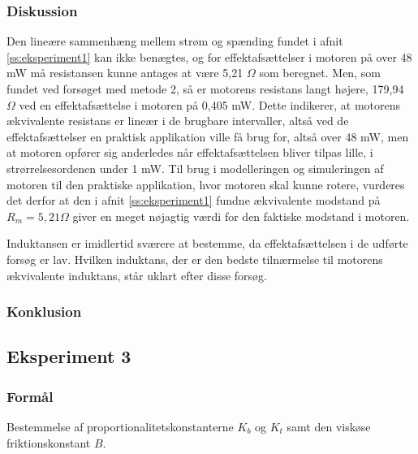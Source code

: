 \subsubsection{Diskussion}
Den lineære sammenhæng mellem strøm og spænding fundet i afnit \ref{ss:eksperiment1} kan ikke benægtes,
og for effektafsættelser i motoren på over 48 mW må resistansen kunne antages at være 5,21 $\Omega$ som beregnet.
Men, som fundet ved forsøget med metode 2, så er motorens resistans langt højere,
179,94 $\Omega$ ved en effektafsættelse i motoren på 0,405 mW.
Dette indikerer, at motorens ækvivalente resistans er lineær i de brugbare intervaller, altså ved de effektafsættelser en
praktisk applikation ville få brug for, altså over 48 mW, men at motoren opfører sig anderledes når effektafsættelsen
bliver tilpas lille, i strørrelsesordenen under 1 mW.
Til brug i modelleringen og simuleringen af motoren til den praktiske applikation, hvor motoren skal kunne rotere,
vurderes det derfor at den i afnit \ref{ss:eksperiment1} fundne ækvivalente modstand på $R_m=5,21 \Omega$ giver en meget
nøjagtig værdi for den faktiske modstand i motoren.

Induktansen er imidlertid sværere at bestemme, da effektafsættelsen i de udførte forsøg er lav.
Hvilken induktans, der er den bedste tilnærmelse til motorens ækvivalente induktans,
står uklart efter disse forsøg.

\subsubsection{Konklusion}


\subsection{Eksperiment 3}
\label{ss:eksperiment3}
\subsubsection{Formål}
Bestemmelse af proportionalitetskonstanterne $K_b$ og $K_t$ samt den viskøse friktionskonstant $B$.
